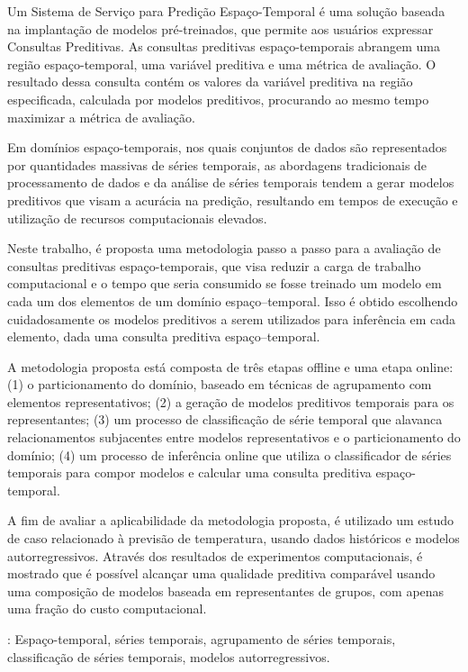 \documentclass[
	final,				%
	12pt,				%
	openright,			%
	oneside,			%
	a4paper,			%
	hyphens,            %
	sumario=tradicional,%
	english,			%
	french,				%
	spanish,			%
	brazil				%
	]{abntex2}
\begin{document}
\setlength{\absparsep}{18pt} %
\begin{resumo}[Resumo]

Um Sistema de Serviço para Predição Espaço-Temporal é uma solução baseada na implantação de modelos pré-treinados, que permite aos usuários expressar Consultas Preditivas. As consultas preditivas espaço-temporais abrangem uma região espaço-temporal, uma variável preditiva e uma métrica de avaliação. O resultado dessa consulta contém os valores da variável preditiva na região especificada, calculada por modelos preditivos, procurando ao mesmo tempo maximizar a métrica de avaliação.
 
 Em domínios espaço-temporais, nos quais conjuntos de dados são representados por quantidades massivas de séries temporais, as abordagens tradicionais de processamento de dados e da análise de séries temporais tendem a gerar modelos preditivos que visam a acurácia na predição, resultando em tempos de execução e utilização de recursos computacionais elevados.

 Neste trabalho, é proposta uma metodologia passo a passo para a avaliação de consultas preditivas espaço-temporais, que visa reduzir a carga de trabalho computacional e o tempo que seria consumido se fosse treinado um modelo em cada um dos elementos de um domínio espaço--temporal. Isso é obtido escolhendo cuidadosamente os modelos preditivos a serem utilizados para inferência em cada elemento, dada uma consulta preditiva espaço--temporal.
 
 A metodologia proposta está composta de três etapas offline e uma etapa online: (1) o particionamento do domínio, baseado em técnicas de agrupamento com elementos representativos; (2) a geração de modelos preditivos temporais para os representantes; (3) um processo de classificação de série temporal que alavanca relacionamentos subjacentes entre modelos representativos e o particionamento do domínio; (4) um processo de inferência online que utiliza o classificador de séries temporais para compor modelos e calcular uma consulta preditiva espaço-temporal.
 
 A fim de avaliar a aplicabilidade da metodologia proposta, é utilizado um estudo de caso relacionado à previsão de temperatura, usando dados históricos e modelos autorregressivos. Através dos resultados de experimentos computacionais, é mostrado que é possível alcançar uma qualidade preditiva comparável usando uma composição de modelos baseada em representantes de grupos, com apenas uma fração do custo computacional.

 \textbf{\palavrasChave}: Espaço-temporal, séries temporais, agrupamento de séries temporais, classificação de séries temporais, modelos autorregressivos.
\end{resumo}
\end{document}
